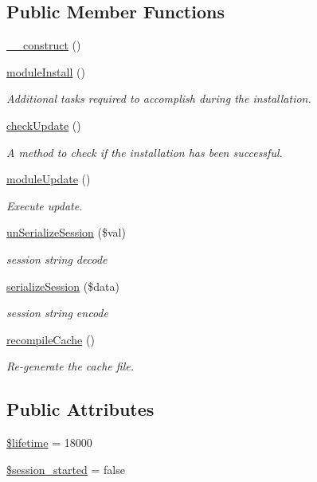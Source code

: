 \subsection*{Public Member Functions}
\begin{DoxyCompactItemize}
\item 
\hyperlink{classsession_a3ed9c9250d95d158bbd8d2ddce408198}{\-\_\-\-\_\-construct} ()
\item 
\hyperlink{classsession_af6b13ec50160d63aca04f689e5cac9dd}{module\-Install} ()
\begin{DoxyCompactList}\small\item\em Additional tasks required to accomplish during the installation. \end{DoxyCompactList}\item 
\hyperlink{classsession_a30f6cc95b00bd35757aa882abce7ac34}{check\-Update} ()
\begin{DoxyCompactList}\small\item\em A method to check if the installation has been successful. \end{DoxyCompactList}\item 
\hyperlink{classsession_ad1eb77a85d7765620658071e49d16cff}{module\-Update} ()
\begin{DoxyCompactList}\small\item\em Execute update. \end{DoxyCompactList}\item 
\hyperlink{classsession_a97462709868f87d6cb050956c7b7da6d}{un\-Serialize\-Session} (\$val)
\begin{DoxyCompactList}\small\item\em session string decode \end{DoxyCompactList}\item 
\hyperlink{classsession_aea7dba13f8bc60c916840c66b2bc28ba}{serialize\-Session} (\$data)
\begin{DoxyCompactList}\small\item\em session string encode \end{DoxyCompactList}\item 
\hyperlink{classsession_a08f5190f8867dc2c0d5c23435b236f15}{recompile\-Cache} ()
\begin{DoxyCompactList}\small\item\em Re-\/generate the cache file. \end{DoxyCompactList}\end{DoxyCompactItemize}
\subsection*{Public Attributes}
\begin{DoxyCompactItemize}
\item 
\hyperlink{classsession_af73b8d0d1528237504be7b85f05c97ed}{\$lifetime} = 18000
\item 
\hyperlink{classsession_aae3391920555707a71e14e15f2929825}{\$session\-\_\-started} = false
\end{DoxyCompactItemize}


